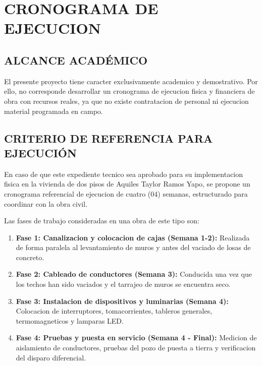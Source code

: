 \chapter*{CRONOGRAMA DE EJECUCION}

\setcounter{section}{0}
\renewcommand{\thesection}{5.\arabic{section}.}
\renewcommand{\thesubsection}{5.\arabic{section}.\arabic{subsection}.}
\renewcommand{\theHsection}{cronograma.\arabic{section}}
\renewcommand{\theHsubsection}{cronograma.\arabic{section}.\arabic{subsection}}

\section{ALCANCE ACADÉMICO}
El presente proyecto tiene caracter exclusivamente academico y demostrativo. Por ello, no corresponde desarrollar un cronograma de ejecucion fisica y financiera de obra con recursos reales, ya que no existe contratacion de personal ni ejecucion material programada en campo.

\section{CRITERIO DE REFERENCIA PARA EJECUCIÓN}
En caso de que este expediente tecnico sea aprobado para su implementacion fisica en la vivienda de dos pisos de Aquiles Taylor Ramos Yapo, se propone un cronograma referencial de ejecucion de cuatro (04) semanas, estructurado para coordinar con la obra civil.

Las fases de trabajo consideradas en una obra de este tipo son:
\begin{enumerate}
  \item \textbf{Fase 1: Canalizacion y colocacion de cajas (Semana 1-2):} Realizada de forma paralela al levantamiento de muros y antes del vaciado de losas de concreto.
  \item \textbf{Fase 2: Cableado de conductores (Semana 3):} Conducida una vez que los techos han sido vaciados y el tarrajeo de muros se encuentra seco.
  \item \textbf{Fase 3: Instalacion de dispositivos y luminarias (Semana 4):} Colocacion de interruptores, tomacorrientes, tableros generales, termomagneticos y lamparas LED.
  \item \textbf{Fase 4: Pruebas y puesta en servicio (Semana 4 - Final):} Medicion de aislamiento de conductores, pruebas del pozo de puesta a tierra y verificacion del disparo diferencial.
\end{enumerate}

